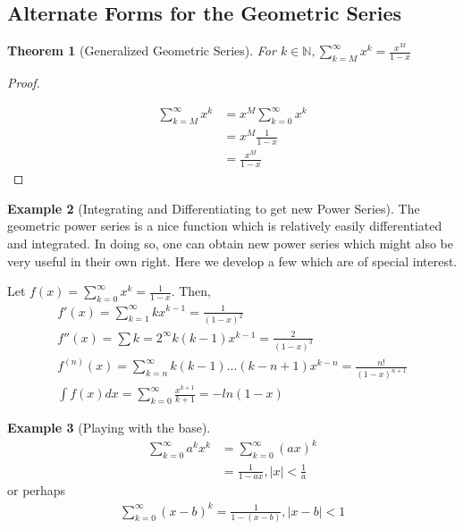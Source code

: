 \documentclass[10pt,]{book}
\theoremstyle{plain}
\newtheorem{theorem}{Theorem}[section]
\theoremstyle{definition}
\theoremstyle{definition}
\newtheorem{example}[theorem]{Example}
\numberwithin{equation}{section}
\newcommand{\lt}{ < }
\begin{document}
\subsection[Alternate Forms for the Geometric Series]{Alternate Forms for the Geometric Series}\label{subsection-2}
\begin{theorem}[Generalized Geometric Series]\label{theorem-2}
For \(k \in \mathbb{N}, \sum_{k=M}^{\infty} {x^k} = \frac{x^M}{1-x}\)\end{theorem}
\begin{proof}\hypertarget{proof-2}{}
\begin{align*}
\sum_{k=M}^{\infty} {x^k} & = x^M \sum_{k=0}^{\infty} {x^k}\\
 & = x^M \frac{1}{1-x}\\
 & = \frac{x^M}{1-x}
\end{align*}\end{proof}
\begin{example}[Integrating and Differentiating to get new Power Series]\label{example-1}
The geometric power series is a nice function which is relatively easily 
				differentiated and integrated. In doing so, one can obtain
				new power series which might also be very useful in their own right.  
				Here we develop a few which are of special interest.%
\par
Let \(f(x) = \sum_{k=0}^\infty x^k = \frac{1}{1-x}\).  Then,%
\begin{gather*}
 f'(x) = \sum_{k=1}^{\infty} {kx^{k-1}} = \frac{1}{(1-x)^2}\\
 f''(x) = \sum{k=2}^{\infty} {k(k-1)x^{k-1}} = \frac{2}{(1-x)^3}\\
 f^{(n)}(x) = \sum_{k=n}^{\infty} {k(k-1)...(k-n+1)x^{k-n}} = 
						  \frac{n!}{(1-x)^{n+1}}\\
 \int f(x) dx = \sum_{k=0}^{\infty} {\frac{x^{k+1}}{k+1}} = -ln(1-x)
\end{gather*}\end{example}
\begin{example}[Playing with the base]\label{example-2}
\begin{align*}
\sum_{k=0}^{\infty} {a^k x^k} & = \sum_{k=0}^{\infty} {(ax)^k}\\
 & = \frac{1}{1-ax}, |x| \lt \frac{1}{a}
\end{align*}or perhaps%
\begin{gather*}
\sum_{k=0}^{\infty} {(x-b)^k} = \frac{1}{1-(x-b)}, |x-b| \lt 1
\end{gather*}\end{example}
\end{document}
